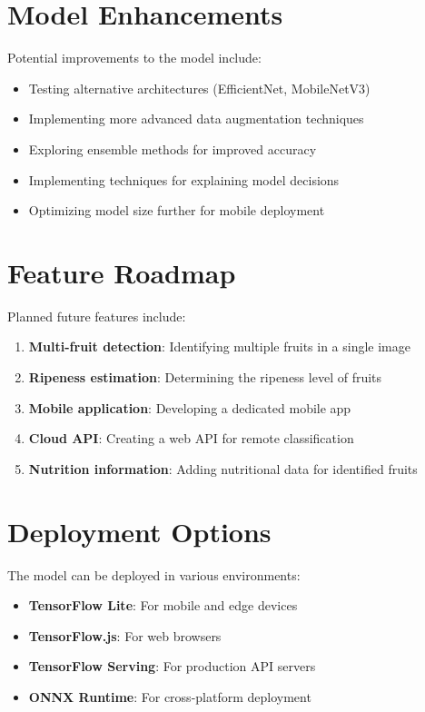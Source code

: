 \documentclass[11pt,a4paper]{report}
\begin{document}
\section{Model Enhancements}
Potential improvements to the model include:

\begin{itemize}
    \item Testing alternative architectures (EfficientNet, MobileNetV3)
    \item Implementing more advanced data augmentation techniques
    \item Exploring ensemble methods for improved accuracy
    \item Implementing techniques for explaining model decisions
    \item Optimizing model size further for mobile deployment
\end{itemize}

\section{Feature Roadmap}
Planned future features include:

\begin{enumerate}
    \item \textbf{Multi-fruit detection}: Identifying multiple fruits in a single image
    \item \textbf{Ripeness estimation}: Determining the ripeness level of fruits
    \item \textbf{Mobile application}: Developing a dedicated mobile app
    \item \textbf{Cloud API}: Creating a web API for remote classification
    \item \textbf{Nutrition information}: Adding nutritional data for identified fruits
\end{enumerate}

\section{Deployment Options}
The model can be deployed in various environments:

\begin{itemize}
    \item \textbf{TensorFlow Lite}: For mobile and edge devices
    \item \textbf{TensorFlow.js}: For web browsers
    \item \textbf{TensorFlow Serving}: For production API servers
    \item \textbf{ONNX Runtime}: For cross-platform deployment
\end{itemize}
\end{document}
